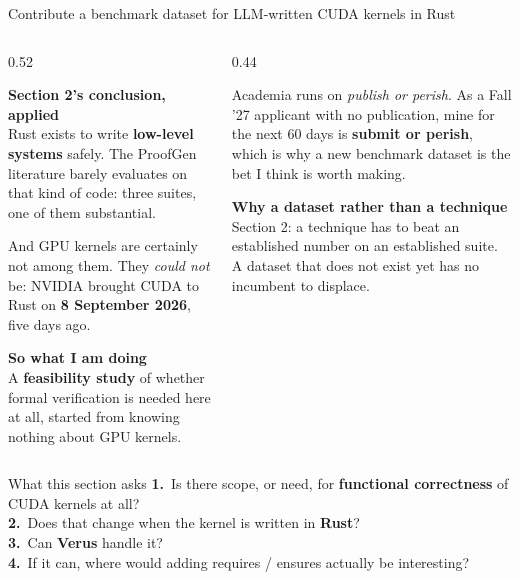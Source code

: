 \documentclass[aspectratio=169,10pt]{beamer}
\newcommand{\code}[1]{{\ttfamily #1}}
\newcommand{\hd}[1]{\textbf{\color{lgTeal}#1}}
\begin{document}
\begin{frame}{Contribute a benchmark dataset for LLM-written CUDA kernels in Rust}

\begin{columns}[T]
\begin{column}{0.52\textwidth}
{\scriptsize
\hd{Section 2's conclusion, applied}\\[2pt]
Rust exists to write \textbf{low-level systems} safely. The ProofGen literature barely evaluates
on that kind of code: three suites, one of them substantial.

\vspace{5pt}
And GPU kernels are certainly not among them. They \emph{could not} be: NVIDIA brought CUDA to
Rust on \textbf{8 September 2026}, five days ago.

\vspace{6pt}
\hd{So what I am doing}\\[2pt]
A \textbf{feasibility study} of whether formal verification is needed here at all, started from
knowing nothing about GPU kernels.
}
\end{column}

\begin{column}{0.44\textwidth}
\begin{callout}[lgGrey]
\scriptsize
Academia runs on \emph{publish or perish}. As a Fall '27 applicant with no publication, mine for
the next 60 days is \textbf{submit or perish}, which is why a new benchmark dataset is the bet
I think is worth making.
\end{callout}

\vspace{6pt}
{\scriptsize
\hd{Why a dataset rather than a technique}\\
Section 2: a technique has to beat an established number on an established suite. A dataset that
does not exist yet has no incumbent to displace.
}
\end{column}
\end{columns}

\vspace{7pt}
\begin{defbox}{What this section asks}
\scriptsize
\textbf{1.}\ Is there scope, or need, for \textbf{functional correctness} of CUDA kernels at
all? \\[2pt]
\textbf{2.}\ Does that change when the kernel is written in \textbf{Rust}? \\[2pt]
\textbf{3.}\ Can \textbf{Verus} handle it? \\[2pt]
\textbf{4.}\ If it can, where would adding \code{requires} / \code{ensures} actually be
interesting?
\end{defbox}

\end{frame}
\end{document}
